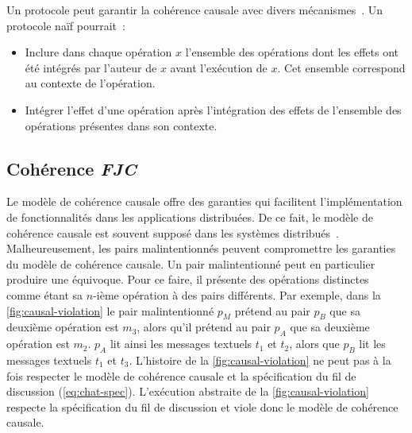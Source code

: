 
Un protocole peut garantir la cohérence causale avec divers mécanismes~\autocite{lamport_1978_time,fidge_1987_timestamps,prakash_1997_barrierbarrier}.
Un protocole naïf pourrait~:

\begin{itemize}
    \item Inclure dans chaque opération $x$ l'ensemble des opérations dont les effets ont été intégrés par l'auteur de $x$ avant l'exécution de $x$.
    Cet ensemble correspond au contexte de l'opération.
    \item Intégrer l'effet d'une opération après l'intégration des effets de l'ensemble des opérations présentes dans son contexte.
\end{itemize}


\subsection{Cohérence \emph{\acl{FJC}}}


Le modèle de cohérence causale offre des garanties qui facilitent l'implémentation de fonctionnalités dans les applications distribuées.
De ce fait, le modèle de cohérence causale est souvent supposé dans les systèmes distribués~\autocite{shapiro_2011_crdt}.
Malheureusement, les pairs malintentionnés peuvent compromettre les garanties du modèle de cohérence causale.
Un pair malintentionné peut en particulier produire une équivoque.
Pour ce faire, il présente des opérations distinctes comme étant sa $n$-ième opération à des pairs différents.
Par exemple, dans la \autoref{fig:causal-violation} le pair malintentionné $p_M$ prétend au pair $p_B$ que sa deuxième opération est $m_3$, alors qu'il prétend au pair $p_A$ que sa deuxième opération est $m_2$.
$p_A$ lit ainsi les messages textuels $t_1$ et $t_2$, alors que $p_B$ lit les messages textuels $t_1$ et $t_3$.
L'histoire de la \autoref{fig:causal-violation} ne peut pas à la fois respecter le modèle de cohérence causale et la spécification du fil de discussion (\autoref{eq:chat-spec}).
L'exécution abstraite de la \autoref{fig:causal-violation} respecte la spécification du fil de discussion et viole donc le modèle de cohérence causale.

